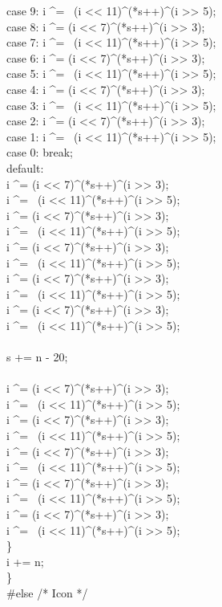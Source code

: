 \begin{specialcode}{\tt\color{blue}}
\>\>\> case 9:   i \^{}= ~(i <{}< 11)\^{}(*s++)\^{}(i >{}> 5);\\
\>\>\> case 8:   i \^{}= (i <{}< 7)\^{}(*s++)\^{}(i >{}> 3);\\
\>\>\> case 7:   i \^{}= ~(i <{}< 11)\^{}(*s++)\^{}(i >{}> 5);\\
\>\>\> case 6:   i \^{}= (i <{}< 7)\^{}(*s++)\^{}(i >{}> 3);\\
\>\>\> case 5:   i \^{}= ~(i <{}< 11)\^{}(*s++)\^{}(i >{}> 5);\\
\>\>\> case 4:   i \^{}= (i <{}< 7)\^{}(*s++)\^{}(i >{}> 3);\\
\>\>\> case 3:   i \^{}= ~(i <{}< 11)\^{}(*s++)\^{}(i >{}> 5);\\
\>\>\> case 2:   i \^{}= (i <{}< 7)\^{}(*s++)\^{}(i >{}> 3);\\
\>\>\> case 1:   i \^{}= ~(i <{}< 11)\^{}(*s++)\^{}(i >{}> 5);\\
\>\>\> case 0:   break;\\
\>\>\> default:\\
\>\>\>\>i \^{}= (i <{}< 7)\^{}(*s++)\^{}(i >{}> 3);\\
\>\>\>\>i \^{}= ~(i <{}< 11)\^{}(*s++)\^{}(i >{}> 5);\\
\>\>\>\>i \^{}= (i <{}< 7)\^{}(*s++)\^{}(i >{}> 3);\\
\>\>\>\>i \^{}= ~(i <{}< 11)\^{}(*s++)\^{}(i >{}> 5);\\
\>\>\>\>i \^{}= (i <{}< 7)\^{}(*s++)\^{}(i >{}> 3);\\
\>\>\>\>i \^{}= ~(i <{}< 11)\^{}(*s++)\^{}(i >{}> 5);\\
\>\>\>\>i \^{}= (i <{}< 7)\^{}(*s++)\^{}(i >{}> 3);\\
\>\>\>\>i \^{}= ~(i <{}< 11)\^{}(*s++)\^{}(i >{}> 5);\\
\>\>\>\>i \^{}= (i <{}< 7)\^{}(*s++)\^{}(i >{}> 3);\\
\>\>\>\>i \^{}= ~(i <{}< 11)\^{}(*s++)\^{}(i >{}> 5);\\
\>\>\>\>\\
\>\>\>\>s += n - 20;\\
\\
\>\>\>\>i \^{}= (i <{}< 7)\^{}(*s++)\^{}(i >{}> 3);\\
\>\>\>\>i \^{}= ~(i <{}< 11)\^{}(*s++)\^{}(i >{}> 5);\\
\>\>\>\>i \^{}= (i <{}< 7)\^{}(*s++)\^{}(i >{}> 3);\\
\>\>\>\>i \^{}= ~(i <{}< 11)\^{}(*s++)\^{}(i >{}> 5);\\
\>\>\>\>i \^{}= (i <{}< 7)\^{}(*s++)\^{}(i >{}> 3);\\
\>\>\>\>i \^{}= ~(i <{}< 11)\^{}(*s++)\^{}(i >{}> 5);\\
\>\>\>\>i \^{}= (i <{}< 7)\^{}(*s++)\^{}(i >{}> 3);\\
\>\>\>\>i \^{}= ~(i <{}< 11)\^{}(*s++)\^{}(i >{}> 5);\\
\>\>\>\>i \^{}= (i <{}< 7)\^{}(*s++)\^{}(i >{}> 3);\\
\>\>\>\>i \^{}= ~(i <{}< 11)\^{}(*s++)\^{}(i >{}> 5);\\
\>\>\}\\
\>\> i += n;\\
\>\}\\
\#else /* Icon */
\end{specialcode}%
